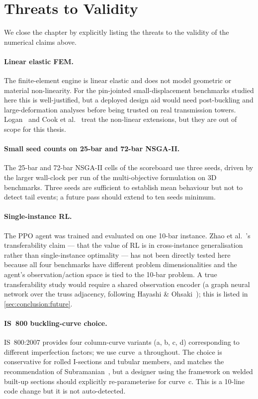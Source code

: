 \section{Threats to Validity}
\label{sec:results:threats}

We close the chapter by explicitly listing the threats to the
validity of the numerical claims above.

\paragraph{Linear elastic FEM.} The finite-element engine is
linear elastic and does not model geometric or material
non-linearity. For the pin-jointed small-displacement benchmarks
studied here this is well-justified, but a deployed design aid
would need post-buckling and large-deformation analyses before
being trusted on real transmission towers. Logan~\cite{logan2017fem}
and Cook et al.~\cite{cook2002fem} treat the non-linear
extensions, but they are out of scope for this thesis.

\paragraph{Small seed counts on 25-bar and 72-bar NSGA-II.} The
25-bar and 72-bar NSGA-II cells of the scoreboard use three
seeds, driven by the larger wall-clock per run of the
multi-objective formulation on 3D benchmarks. Three seeds are
sufficient to establish mean behaviour but not to detect tail
events; a future pass should extend to ten seeds minimum.

\paragraph{Single-instance RL.} The PPO agent was trained and
evaluated on one 10-bar instance. Zhao et
al.~\cite{zhao2021rl}'s transferability claim --- that the
value of RL is in cross-instance generalisation rather than
single-instance optimality --- has not been directly tested here
because all four benchmarks have different problem
dimensionalities and the agent's observation/action space is
tied to the 10-bar problem. A true transferability study would
require a shared observation encoder (a graph neural network
over the truss adjacency, following
Hayashi \& Ohsaki~\cite{hayashi2020rl}); this is listed in
\cref{sec:conclusion:future}.

\paragraph{IS~800 buckling-curve choice.} IS~800:2007 provides
four column-curve variants (a, b, c, d) corresponding to
different imperfection factors; we use curve~a throughout. The
choice is conservative for rolled I-sections and tubular
members, and matches the recommendation of
Subramanian~\cite{subramanian2008}, but a designer using the
framework on welded built-up sections should explicitly
re-parameterise for curve~c. This is a \num{10}-line code
change but it is not auto-detected.

